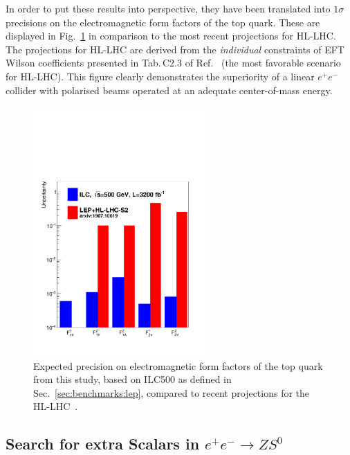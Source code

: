 In order to put these results into perspective, they have been translated into $1\sigma$ precisions on the electromagnetic form factors of the top quark. These are displayed in Fig.~\ref{fig:ttbar:formfac} in comparison to the most recent projections for HL-LHC. %
The projections for HL-LHC are derived from the {\em individual} constraints of EFT Wilson coefficients presented in Tab.\,C2.3 of Ref.~\cite{Durieux:2019rbz} (the most favorable scenario for HL-LHC). This figure clearly demonstrates the superiority of a linear $e^+e^-$ collider with polarised beams operated at an adequate center-of-mass energy.             
\begin{figure}[htbp]
\begin{center} \includegraphics[width=0.6\textwidth]{Performance/fig/couplilclhc}
\end{center}
\caption{Expected precision on electromagnetic form factors of the top quark from this study, based on ILC500 as defined in Sec.~\ref{sec:benchmarks:lep}, compared to recent projections for the HL-LHC~\cite{Durieux:2019rbz}.}
\label{fig:ttbar:formfac}
\end{figure}

\subsection{Search for extra Scalars in \texorpdfstring{$e^+e^- \to ZS^0$}{e+e- -> ZS^0}}
\label{subsec:bench:extraH}

